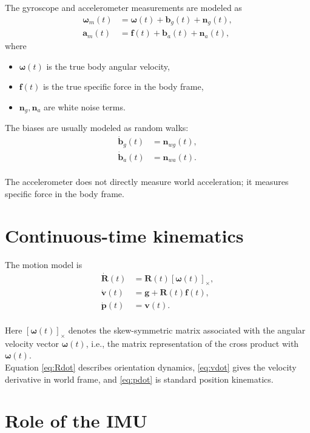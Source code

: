 \documentclass[11pt]{article}
\newcommand{\crossmat}[1]{\left[#1\right]_{\times}}
\begin{document}
The gyroscope and accelerometer measurements are modeled as
\begin{align}
\boldsymbol{\omega}_m(t) &= \boldsymbol{\omega}(t) + \mathbf{b}_g(t) + \mathbf{n}_g(t), \\
\mathbf{a}_m(t) &= \mathbf{f}(t) + \mathbf{b}_a(t) + \mathbf{n}_a(t),
\end{align}
where
\begin{itemize}
  \item \(\boldsymbol{\omega}(t)\) is the true body angular velocity,
  \item \(\mathbf{f}(t)\) is the true specific force in the body frame,
  \item \(\mathbf{n}_g,\mathbf{n}_a\) are white noise terms.
\end{itemize}
The biases are usually modeled as random walks:
\begin{align}
\dot{\mathbf{b}}_g(t) &= \mathbf{n}_{wg}(t), \\
\dot{\mathbf{b}}_a(t) &= \mathbf{n}_{wa}(t).
\end{align}
\\
The accelerometer does not directly measure world acceleration; it measures specific force in the body frame.

\section{Continuous-time kinematics}

The motion model is
\begin{align}
\dot{\mathbf{R}}(t) &= \mathbf{R}(t)\crossmat{\boldsymbol{\omega}(t)}, \label{eq:Rdot}\\
\dot{\mathbf{v}}(t) &= \mathbf{g} + \mathbf{R}(t)\mathbf{f}(t), \label{eq:vdot}\\
\dot{\mathbf{p}}(t) &= \mathbf{v}(t). \label{eq:pdot}
\end{align}
\\
Here \(\crossmat{\boldsymbol{\omega}(t)}\) denotes the skew-symmetric matrix associated with the angular velocity vector \(\boldsymbol{\omega}(t)\), i.e., the matrix representation of the cross product with \(\boldsymbol{\omega}(t)\).
\\
Equation \eqref{eq:Rdot} describes orientation dynamics, \eqref{eq:vdot} gives the velocity derivative in world frame, and \eqref{eq:pdot} is standard position kinematics.

\section{Role of the IMU}
\end{document}
